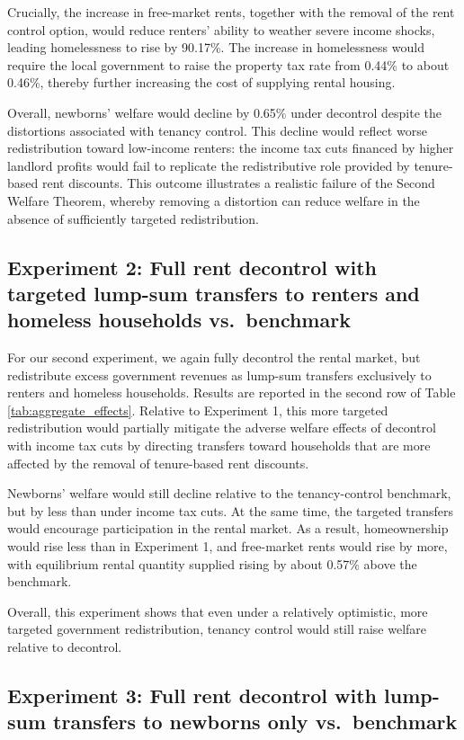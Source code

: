 \documentclass[parskip=full]{article}
\begin{document}
Crucially, the increase in free-market rents, together with the removal of the rent control option, would reduce renters’ ability to weather severe income shocks, leading homelessness to rise by 90.17\%. The increase in homelessness would require the local government to raise the property tax rate from 0.44\% to about 0.46\%, thereby further increasing the cost of supplying rental housing.

Overall, newborns’ welfare would decline by 0.65\% under decontrol despite the distortions associated with tenancy control. This decline would reflect worse redistribution toward low-income renters: the income tax cuts financed by higher landlord profits would fail to replicate the redistributive role provided by tenure-based rent discounts. This outcome illustrates a realistic failure of the Second Welfare Theorem, whereby removing a distortion can reduce welfare in the absence of sufficiently targeted redistribution.

\subsection{Experiment 2: Full rent decontrol with targeted lump-sum transfers to renters and homeless households vs.\ benchmark}\label{sec:exp_2}

For our second experiment, we again fully decontrol the rental market, but redistribute excess government revenues as lump-sum transfers exclusively to renters and homeless households. Results are reported in the second row of Table \ref{tab:aggregate_effects}. Relative to Experiment 1, this more targeted redistribution would partially mitigate the adverse welfare effects of decontrol with income tax cuts by directing transfers toward households that are more affected by the removal of tenure-based rent discounts.

Newborns’ welfare would still decline relative to the tenancy-control benchmark, but by less than under income tax cuts. At the same time, the targeted transfers would encourage participation in the rental market. As a result, homeownership would rise less than in Experiment 1, and free-market rents would rise by more, with equilibrium rental quantity supplied rising by about 0.57\% above the benchmark.

Overall, this experiment shows that even under a relatively optimistic, more targeted government redistribution, tenancy control would still raise welfare relative to decontrol.

\subsection{Experiment 3: Full rent decontrol with lump-sum transfers to newborns only vs.\ benchmark}\label{sec:exp_3}
\end{document}
